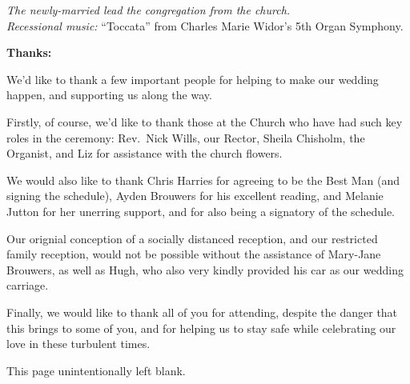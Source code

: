 \documentclass[a4paper,12pt,titlepage]{article}
\begin{document}
{\em The newly-married lead the congregation from the church.}\\

{\em Recessional music:} ``Toccata'' from Charles Marie Widor's 5th Organ Symphony.


\clearpage 


{\bf Thanks:}

\hspace{2em} We'd like to thank a few important people for helping to make our wedding happen, and supporting us along the way.


\hspace{2em} Firstly, of course, we'd like to thank those at the Church who have had such key roles in the ceremony: Rev.~Nick Wills, our Rector, Sheila Chisholm, the Organist, and Liz for assistance with the church flowers. 


\hspace{2em} We would also like to thank Chris Harries for agreeing to be the Best Man (and signing the schedule), Ayden Brouwers for his excellent reading, and Melanie Jutton for her unerring support, and for also being a signatory of the schedule. 

\hspace{2em} Our orignial conception of a socially distanced reception, and our restricted family reception, would not be possible without the assistance of Mary-Jane Brouwers, as well as Hugh, who also very kindly provided his car as our wedding carriage. 

\hspace{2em} Finally, we would like to thank all of you for attending, despite the danger that this brings to some of you, and for helping us to stay safe while celebrating our love in these turbulent times. 

\clearpage

\begin{center}
    \vspace*{\fill}
    {\centering \tiny
    This page unintentionally left blank.
    }    
    \vspace*{\fill}
\end{center}


\thispagestyle{empty}
 
\end{document}
